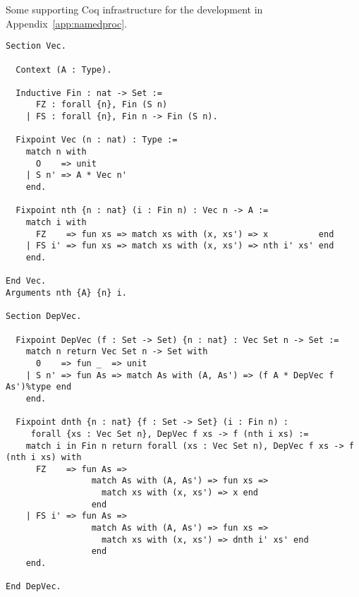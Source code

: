 \documentclass{article}
\begin{document}
Some supporting Coq infrastructure for the development in Appendix~\ref{app:namedproc}.

\begin{lstlisting}[language=coq]
Section Vec.

  Context (A : Type).

  Inductive Fin : nat -> Set :=
      FZ : forall {n}, Fin (S n)
    | FS : forall {n}, Fin n -> Fin (S n).

  Fixpoint Vec (n : nat) : Type :=
    match n with
      O    => unit
    | S n' => A * Vec n'
    end.

  Fixpoint nth {n : nat} (i : Fin n) : Vec n -> A :=
    match i with
      FZ    => fun xs => match xs with (x, xs') => x          end
    | FS i' => fun xs => match xs with (x, xs') => nth i' xs' end
    end.

End Vec.
Arguments nth {A} {n} i.

Section DepVec.

  Fixpoint DepVec (f : Set -> Set) {n : nat} : Vec Set n -> Set :=
    match n return Vec Set n -> Set with
      0    => fun _  => unit
    | S n' => fun As => match As with (A, As') => (f A * DepVec f As')%type end
    end.

  Fixpoint dnth {n : nat} {f : Set -> Set} (i : Fin n) :
     forall {xs : Vec Set n}, DepVec f xs -> f (nth i xs) :=
    match i in Fin n return forall (xs : Vec Set n), DepVec f xs -> f (nth i xs) with
      FZ    => fun As =>
                 match As with (A, As') => fun xs =>
                   match xs with (x, xs') => x end
                 end
    | FS i' => fun As =>
                 match As with (A, As') => fun xs =>
                   match xs with (x, xs') => dnth i' xs' end
                 end
    end.

End DepVec.
\end{lstlisting}



\end{document}
